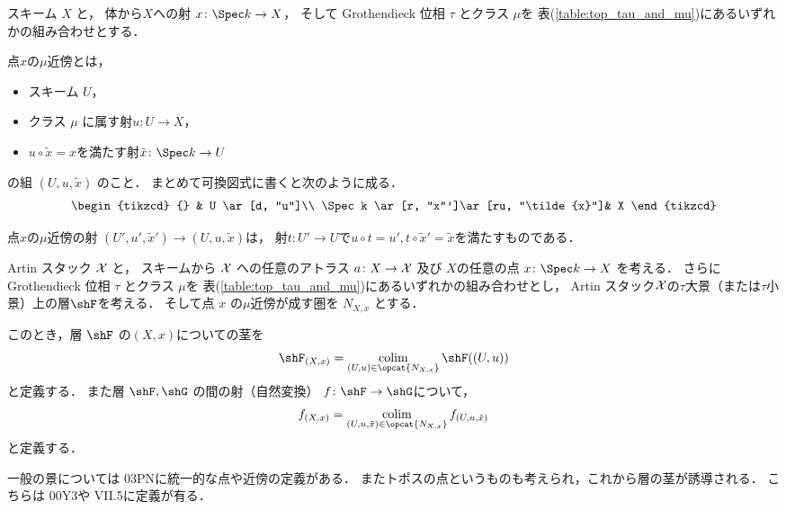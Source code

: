     \begin{Def}[スキームの点の近傍]\label{def:nbds_of_point_in_sch}
        スキーム $X$ と，
        体から$X$への射 $x \colon \Spec k \to X$，
        そして Grothendieck 位相 $\tau$ とクラス $\mu$を
        表(\ref{table:top_tau_and_mu})にあるいずれかの組み合わせとする．
        
        点$x$の$\mu$近傍とは，
        \begin{itemize}
            \item スキーム $U$，
            \item クラス $\mu$ に属す射$u \colon U \to X$，
            \item $u \circ \tilde{x}=x$を満たす射$\tilde{x} \colon \Spec k \to U$
        \end{itemize}
        の組 $(U,u,\tilde{x})$ のこと．
        まとめて可換図式に書くと次のように成る．
        \[
        \begin{tikzcd}
            {} & U \ar[d, "u"]\\
            \Spec k \ar[r, "x"']\ar[ru, "\tilde{x}"]& X 
        \end{tikzcd}
        \]
        
        点$x$の$\mu$近傍の射 $(U',u',\tilde{x}') \to (U,u,\tilde{x})$は，
        射$t \colon U' \to U$で$u \circ t=u', t \circ \tilde{x}'=\tilde{x}$を満たすものである．
    \end{Def}

    \begin{Def}\label{def:stalk_and_mor_of_stalk}
         Artin スタック $\mathcal{X}$ と，
        スキームから $\mathcal{X}$ への任意のアトラス $a \colon X \to \mathcal{X}$ 及び
        $X$の任意の点 $x \colon \Spec k \to X$ を考える．
        さらに Grothendieck 位相 $\tau$ とクラス $\mu$を
        表(\ref{table:top_tau_and_mu})にあるいずれかの組み合わせとし，
         Artin スタック$\mathcal{X}$の$\tau$大景（または$\tau$小景）上の層$\shF$を考える．
        そして点 $x$ の$\mu$近傍が成す圏を $N_{X,x}$ とする．

        このとき，層 $\shF$ の$(X,x)$についての茎を
        \[ \shF_{(X,x)} = \colim_{(U,u) \in \opcat{N_{X,x}}} \shF((U,u)) \]
        と定義する．
        また層 $\shF, \shG$ の間の射（自然変換） $f \colon \shF \to \shG$について，
        \[ f_{(X,x)}=\colim_{(U,u,\tilde{x}) \in \opcat{N_{X,x}}} f_{(U,u,\tilde{x})} \]
        と定義する．
    \end{Def}

    一般の景については\cite{SP} 03PNに統一的な点や近傍の定義がある．
    またトポスの点というものも考えられ，これから層の茎が誘導される．
    こちらは\cite{SP} 00Y3や\cite{MM92} VII.5に定義が有る．

